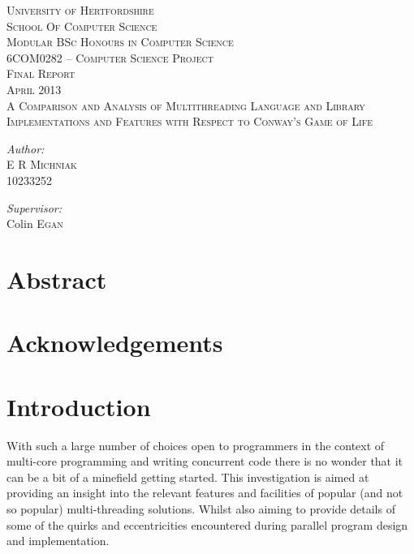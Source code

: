\documentclass[11pt]{article} %
\begin{document}
\begin{titlepage}
\begin{center}
\textsc{\LARGE University of Hertfordshire}\\[0.5cm]
\textsc{\Large School Of Computer Science}\\[1.5cm]
\textsc{\Large Modular BSc Honours in Computer Science}\\[1.5cm]
\textsc{\Large 6COM0282 – Computer Science Project}\\[3cm]
\textsc{\Large Final Report}\\[0.5cm]
\textsc{\Large April 2013}\\[3.5cm]
\textsc{\Large A Comparison and Analysis of Multithreading Language and Library Implementations and Features with Respect to Conway's Game of Life}\\[0.5cm]
\vfill
\begin{minipage}{0.4\textwidth}
\begin{flushleft} \large
\emph{Author:}\\
E R \textsc{Michniak} \\ 10233252
\end{flushleft}
\end{minipage}
\begin{minipage}{0.4\textwidth}
\begin{flushright} \large
\emph{Supervisor:} \\
Colin \textsc{Egan} \\
\end{flushright}
\end{minipage}
\end{center}
\end{titlepage}

\pagebreak
\tableofcontents
\section{Abstract}
\section{Acknowledgements}
\section{Introduction}
With such a large number of choices open to programmers in the context of multi-core programming and writing concurrent code there is no wonder that it can be a bit of a minefield getting started. This investigation is aimed at providing an insight into the relevant features and facilities of popular (and not so popular) multi-threading solutions. Whilst also aiming to provide details of some of the quirks and eccentricities encountered during parallel program design and implementation.
\end{document}

